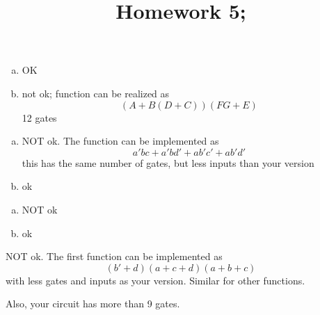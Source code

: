 \documentclass[10pt]{article} %
\title{Homework 5;
}
\begin{document}
\maketitle
{}
\begin{enumerate}[(a)]
	\item OK
	\item not ok; function can be realized as
		\begin{equation*}
			(A+B(D+C))(FG+E)
		\end{equation*}
		12 gates
\end{enumerate}
\begin{enumerate}[(a)]
	\item NOT ok. The function can be implemented as
		\begin{equation*}
			a'bc+a'bd'+ab'c'+ab'd'
		\end{equation*}
		this has the same number of gates, but less inputs than your
		version
	\item ok
\end{enumerate}
\begin{enumerate}[(a)]
	\item NOT ok
	\item ok
\end{enumerate}
NOT ok. The first function can be implemented as\begin{equation*}
	(b'+d)(a+c+d)(a+b+c)
\end{equation*}
with less gates and inputs as your version. Similar for other functions.

Also, your circuit has more than 9 gates.
\end{document}

